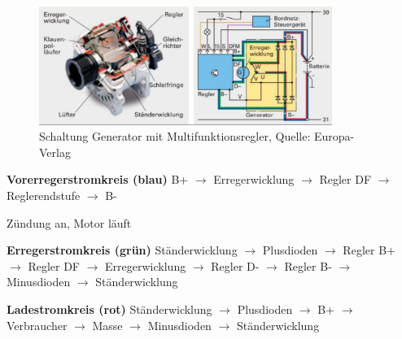 \newpage

\begin{figure}[!ht]%
\centering
\includegraphics[width=0.85\textwidth]{images/Generator/Generator-10.pdf}
\caption{Schaltung Generator mit Multifunktionsregler, Quelle:
Europa-Verlag}
\end{figure}

\textbf{Vorerregerstromkreis (blau)} B+ $\to$ Erregerwicklung $\to$
Regler DF $\to$ Reglerendstufe $\to$ B-

Zündung an, Motor läuft

\textbf{Erregerstromkreis (grün)} Ständerwicklung $\to$ Plusdioden
$\to$ Regler B+ $\to$ Regler DF $\to$ Erregerwicklung $\to$
Regler D- $\to$ Regler B- $\to$ Minusdioden $\to$ Ständerwicklung

\textbf{Ladestromkreis (rot)} Ständerwicklung $\to$ Plusdioden $\to$
B+ $\to$ Verbraucher $\to$ Masse $\to$ Minusdioden $\to$
Ständerwicklung
